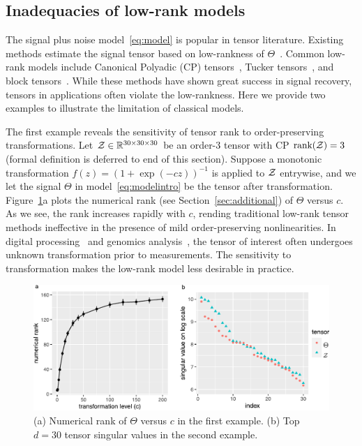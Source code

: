 \documentclass[11pt]{article}
\theoremstyle{plain}
\theoremstyle{definition}
\begin{document}
\subsection{Inadequacies of  low-rank models} The signal plus noise model~\eqref{eq:model} is popular in tensor literature. Existing methods estimate the signal tensor based on low-rankness of $\Theta$~\citep{jain2014provable,montanari2018spectral}. Common low-rank models include Canonical Polyadic (CP) tensors~\citep{hitchcock1927expression}, Tucker tensors~\citep{de2000multilinear}, and block tensors~\citep{wang2019multiway}. While these methods have shown great success in signal recovery, tensors in applications often violate the low-rankness. Here we provide two examples to illustrate the limitation of classical models.


The first example reveals the sensitivity of tensor rank to order-preserving transformations. Let $\mathcal{Z} \in \mathbb{R}^{30\times 30\times 30}$ be an order-3 tensor with CP $\text{rank}(\mathcal{Z})=3$ (formal definition is deferred to end of this section). Suppose a monotonic transformation $f(z)=(1+\exp(-cz))^{-1}$ is applied to $\mathcal{Z}$ entrywise, and we let the signal $\Theta$ in model~\eqref{eq:modelintro} be the tensor after transformation. Figure~\ref{fig:example}a plots the numerical rank (see Section~\ref{sec:additional}) of $\Theta$ versus $c$. As we see, the rank increases rapidly with $c$, rending traditional low-rank tensor methods ineffective in the presence of mild order-preserving nonlinearities. In  digital processing~\citep{ghadermarzy2018learning} and genomics analysis~\citep{hore2016tensor}, the tensor of interest often undergoes unknown transformation prior to measurements. The sensitivity to transformation makes the low-rank model less desirable in practice. 


\begin{figure}[h]
\centering
\includegraphics[width=.8\textwidth]{figure/example_comb.pdf}
\caption{(a) Numerical rank of $\Theta$ versus $c$ in the first example. (b) Top $d=30$ tensor singular values in the second example. }\label{fig:example}
\end{figure}
\end{document}

